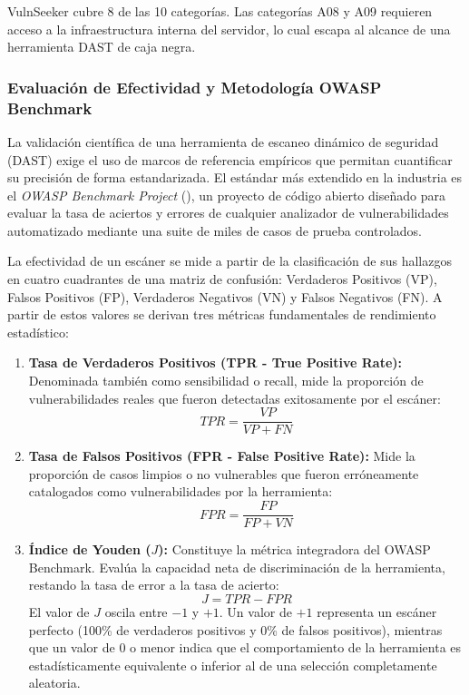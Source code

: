 \documentclass[12pt, a4paper]{article}
\begin{document}
VulnSeeker cubre 8 de las 10 categorías. Las categorías A08 y A09 requieren
acceso a la infraestructura interna del servidor, lo cual escapa al alcance de
una herramienta DAST de caja negra.

\subsubsection{Evaluación de Efectividad y Metodología OWASP Benchmark}

La validación científica de una herramienta de escaneo dinámico de seguridad
(DAST) exige el uso de marcos de referencia empíricos que permitan cuantificar
su precisión de forma estandarizada. El estándar más extendido en la
industria es el \textit{OWASP Benchmark Project} (\cite{owaspbenchmark}), un
proyecto de código abierto diseñado para evaluar la tasa de aciertos y errores de
cualquier analizador de vulnerabilidades automatizado mediante una suite de miles
de casos de prueba controlados.

La efectividad de un escáner se mide a partir de la clasificación de sus
hallazgos en cuatro cuadrantes de una matriz de confusión: Verdaderos Positivos
(VP), Falsos Positivos (FP), Verdaderos Negativos (VN) y Falsos Negativos (FN).
A partir de estos valores se derivan tres métricas fundamentales de
rendimiento estadístico:

\begin{enumerate}
    \item \textbf{Tasa de Verdaderos Positivos (TPR - True Positive Rate):}
    Denominada también como sensibilidad o recall, mide la proporción de
    vulnerabilidades reales que fueron detectadas exitosamente por el escáner:
    \[ TPR = \frac{VP}{VP + FN} \]

    \item \textbf{Tasa de Falsos Positivos (FPR - False Positive Rate):} Mide
    la proporción de casos limpios o no vulnerables que fueron erróneamente
    catalogados como vulnerabilidades por la herramienta:
    \[ FPR = \frac{FP}{FP + VN} \]

    \item \textbf{Índice de Youden ($J$):} Constituye la métrica integradora
    del OWASP Benchmark. Evalúa la capacidad neta de discriminación de la
    herramienta, restando la tasa de error a la tasa de acierto:
    \[ J = TPR - FPR \]
    El valor de $J$ oscila entre $-1$ y $+1$. Un valor de $+1$ representa un
    escáner perfecto (100\% de verdaderos positivos y 0\% de falsos positivos),
    mientras que un valor de $0$ o menor indica que el comportamiento de la
    herramienta es estadísticamente equivalente o inferior al de una selección
    completamente aleatoria.
\end{enumerate}
\end{document}
